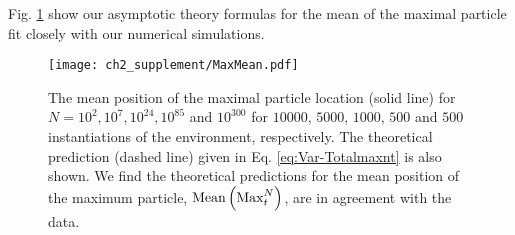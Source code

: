 Fig. \ref{fig:MaxMean} show our asymptotic theory formulas for the mean of the maximal particle fit closely with our numerical simulations.


\begin{figure}[ht]
\begin{center}
 \texttt{[image: ch2\_supplement/MaxMean.pdf]}
 \caption{The mean position of the maximal particle location (solid line) for $N=10^2, 10^{7}, 10^{24}, 10^{85}$ and $10^{300}$ for $10000$, $5000$, $1000$, $500$ and $500$ instantiations of the environment, respectively. The theoretical prediction (dashed line) given in Eq. \eqref{eq:Var-Totalmaxnt} is also shown. We find the theoretical predictions for the mean position of the maximum particle, $\mathrm{Mean}\left(\mathrm{Max}^{N}_t\right)$, are in agreement with the data.}
 \label{fig:MaxMean}
\end{center}
\end{figure}
